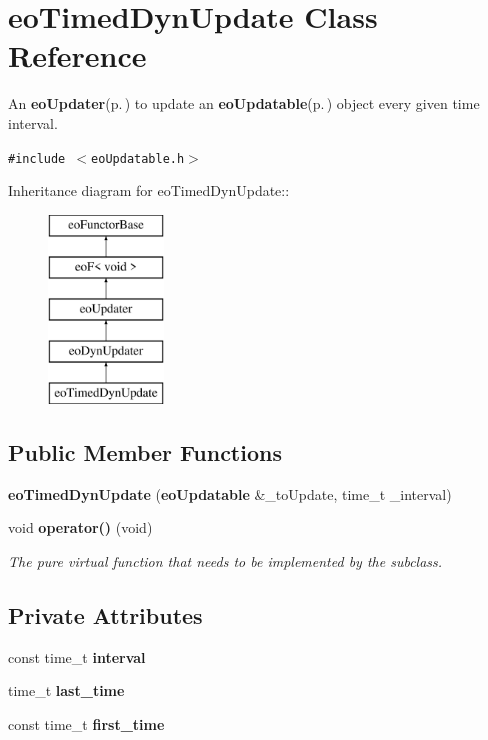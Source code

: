 \section{eo\-Timed\-Dyn\-Update Class Reference}
\label{classeo_timed_dyn_update}
An {\bf eo\-Updater}{\rm (p.\,\pageref{classeo_updater})} to update an {\bf eo\-Updatable}{\rm (p.\,\pageref{classeo_updatable})} object every given time interval.  


{\tt \#include $<$eo\-Updatable.h$>$}

Inheritance diagram for eo\-Timed\-Dyn\-Update::\begin{figure}[H]
\begin{center}
\leavevmode
\includegraphics[height=5cm]{classeo_timed_dyn_update}
\end{center}
\end{figure}
\subsection*{Public Member Functions}
\begin{CompactItemize}
\item 
{\bf eo\-Timed\-Dyn\-Update} ({\bf eo\-Updatable} \&\_\-to\-Update, time\_\-t \_\-interval)\label{classeo_timed_dyn_update_a0}

\item 
void {\bf operator()} (void)\label{classeo_timed_dyn_update_a1}

\begin{CompactList}\small\item\em The pure virtual function that needs to be implemented by the subclass. \item\end{CompactList}\end{CompactItemize}
\subsection*{Private Attributes}
\begin{CompactItemize}
\item 
const time\_\-t {\bf interval}\label{classeo_timed_dyn_update_r0}

\item 
time\_\-t {\bf last\_\-time}\label{classeo_timed_dyn_update_r1}

\item 
const time\_\-t {\bf first\_\-time}\label{classeo_timed_dyn_update_r2}

\end{CompactItemize}


